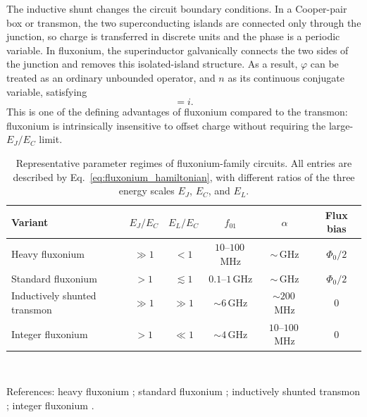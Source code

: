 The inductive shunt changes the circuit boundary conditions. In a Cooper-pair box or transmon, the two superconducting islands are connected only through the junction, so charge is transferred in discrete units and the phase is a periodic variable. In fluxonium, the superinductor galvanically connects the two sides of the junction and removes this isolated-island structure. As a result, \(\varphi\) can be treated as an ordinary unbounded operator, and \(n\) as its continuous conjugate variable, satisfying
\begin{equation}
    [\varphi,n] = i.
\end{equation}
This is one of the defining advantages of fluxonium compared to the transmon: fluxonium is intrinsically insensitive to offset charge without requiring the large-\(E_J/E_C\) limit.

\begin{table}[t]
\centering
\small
\setlength{\tabcolsep}{4pt}
\renewcommand{\arraystretch}{1.3}
\caption[Representative parameter regimes of fluxonium-family circuits.]{Representative parameter regimes of fluxonium-family circuits. All entries are described by Eq.~\eqref{eq:fluxonium_hamiltonian}, with different ratios of the three energy scales \(E_J\), \(E_C\), and \(E_L\).}
\label{tab:fluxonium_variants}
\begin{tabular}{@{}>{\raggedright\arraybackslash}p{3.4cm} c c c c c@{}}
    \hline\hline
    Variant & $E_J/E_C$ & $E_L/E_C$ & $f_{01}$ & $\alpha$ & Flux bias \\
    \hline
    Heavy fluxonium & $\gg 1$ & $< 1$ & $10$--$100$\,MHz & $\sim$\,GHz & $\Phi_0/2$ \\[6pt]
    Standard fluxonium & $> 1$ & $\lesssim 1$ & $0.1$--$1$\,GHz & $\sim$\,GHz & $\Phi_0/2$ \\[6pt]
    Inductively shunted transmon & $\gg 1$ & $\gg 1$ & $\sim 6$\,GHz & $\sim 200$\,MHz & $0$ \\[6pt]
    Integer fluxonium & $> 1$ & $\ll 1$ & $\sim 4$\,GHz & $10$--$100$\,MHz & $0$ \\
    \hline\hline
\end{tabular}
\\[6pt]
{\raggedright\footnotesize References: heavy fluxonium \cite{Earnest2018,Zhang2021,Ficheux2021}; standard fluxonium \cite{Nguyen2019,Somoroff2023,Bao2022,Dogan2023,Ding2023,Moskalenko2022}; inductively shunted transmon \cite{Hassani2023,Zobrist2026}; integer fluxonium \cite{Mencia2024}.\par}
\end{table}

